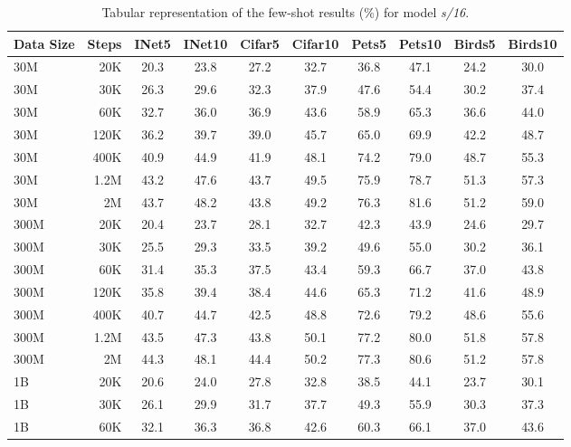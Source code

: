 \begin{table}[t]
  \setlength{\tabcolsep}{5pt}
  \setlength{\extrarowheight}{5pt}
  \renewcommand{\arraystretch}{0.75}
  \centering
  \caption{Tabular representation of the few-shot results (\%) for model \emph{s/16}.}\label{tbl:xs_16}
  \begin{tabulary}{1.0\textwidth}{l r c c c c c c c c}
    \toprule[1pt]
    \bf{Data Size} & \bf{Steps} & \bf{INet5} & \bf{INet10} & \bf{Cifar5} & \bf{Cifar10} & \bf{Pets5} & \bf{Pets10} & \bf{Birds5} & \bf{Birds10} \\
    \midrule
30M   & 20K   & 20.3 & 23.8 & 27.2 & 32.7 & 36.8 & 47.1 & 24.2 & 30.0 \\
30M   & 30K   & 26.3 & 29.6 & 32.3 & 37.9 & 47.6 & 54.4 & 30.2 & 37.4 \\
30M   & 60K   & 32.7 & 36.0 & 36.9 & 43.6 & 58.9 & 65.3 & 36.6 & 44.0 \\
30M   & 120K  & 36.2 & 39.7 & 39.0 & 45.7 & 65.0 & 69.9 & 42.2 & 48.7 \\
30M   & 400K  & 40.9 & 44.9 & 41.9 & 48.1 & 74.2 & 79.0 & 48.7 & 55.3 \\
30M   & 1.2M  & 43.2 & 47.6 & 43.7 & 49.5 & 75.9 & 78.7 & 51.3 & 57.3 \\
30M   & 2M    & 43.7 & 48.2 & 43.8 & 49.2 & 76.3 & 81.6 & 51.2 & 59.0 \\
\midrule[0.25pt]
300M  & 20K   & 20.4 & 23.7 & 28.1 & 32.7 & 42.3 & 43.9 & 24.6 & 29.7 \\
300M  & 30K   & 25.5 & 29.3 & 33.5 & 39.2 & 49.6 & 55.0 & 30.2 & 36.1 \\
300M  & 60K   & 31.4 & 35.3 & 37.5 & 43.4 & 59.3 & 66.7 & 37.0 & 43.8 \\
300M  & 120K  & 35.8 & 39.4 & 38.4 & 44.6 & 65.3 & 71.2 & 41.6 & 48.9 \\
300M  & 400K  & 40.7 & 44.7 & 42.5 & 48.8 & 72.6 & 79.2 & 48.6 & 55.6 \\
300M  & 1.2M  & 43.5 & 47.3 & 43.8 & 50.1 & 77.2 & 80.0 & 51.8 & 57.8 \\
300M  & 2M    & 44.3 & 48.1 & 44.4 & 50.2 & 77.3 & 80.6 & 51.2 & 57.8 \\
\midrule[0.25pt]
1B    & 20K   & 20.6 & 24.0 & 27.8 & 32.8 & 38.5 & 44.1 & 23.7 & 30.1 \\
1B    & 30K   & 26.1 & 29.9 & 31.7 & 37.7 & 49.3 & 55.9 & 30.3 & 37.3 \\
1B    & 60K   & 32.1 & 36.3 & 36.8 & 42.6 & 60.3 & 66.1 & 37.0 & 43.6 \\

\end{tabulary}
\end{table}
